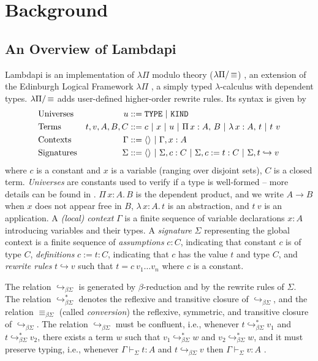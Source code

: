 \section{Background}
\label{sect:background}

\subsection{An Overview of Lambdapi}
\label{ssect:lambdapi-overview}

Lambdapi is an implementation of $\lambda\Pi$ modulo theory ($\lpm$) \cite{lambdapi}, an extension of the Edinburgh Logical Framework $\lambda\Pi$ \cite{lf}, a simply typed $\lambda$-calculus with dependent types. $\lpm$ adds user-defined higher-order rewrite rules. Its syntax is given by
%
\begin{align*}
&\text{Universes}  &u &::= \tt{TYPE} ~|~ \tt{KIND} \\
&\text{Terms}   &t,v, A,B,C &::= c ~|~ x ~|~ u ~|~ \Pi\,x : A,\,B~|~ \lambda\,x : A,\,t ~|~t~v \\
&\text{Contexts}   &\Gamma &::= \langle \rangle ~|~ \Gamma, x : A \\
&\text{Signatures}  &\Sigma &::= \langle \rangle ~|~ \Sigma, c : C ~|~ \Sigma, c := t : C ~|~ \Sigma, t \hookrightarrow v 
\end{align*}
%
where $c$ is a constant and $x$ is a variable  (ranging over disjoint sets), $C$ is a closed term. \emph{Universes} are constants used to verify if a type is well-formed -- more details can be found in \cite[\S 2.1]{lf}. $\Pi\,x : A.\,B$ is the dependent product, and we write $A \rightarrow B$ when $x$ does not appear free in $B$, $\lambda\,x : A.\,t$ is an abstraction, and  $t~v$ is an application. A \emph{(local) context} $\Gamma$ is a finite sequence of variable declarations $x:A$ introducing variables and their types.
A \emph{signature} $\Sigma$ representing the global context is a finite sequence of \emph{assumptions} $c : C$, indicating that constant $c$ is of type $C$, \emph{definitions} $c := t : C$, indicating that $c$ has the value $t$ and type $C$, and \emph{rewrite rules} $t \hookrightarrow v$ such that $t = c~v_1 \dots v_n$ where $c$ is a constant.

The relation $\hookrightarrow_{\beta\Sigma}$ is generated by $\beta$-reduction and by the rewrite rules of $\Sigma$. The relation $\hookrightarrow_{\beta\Sigma}^*$ denotes the reflexive and transitive closure of $\hookrightarrow_{\beta\Sigma}$, and the relation $\equiv_{\beta\Sigma}$ (called \emph{conversion}) the reflexive, symmetric, and transitive closure of $\hookrightarrow_{\beta\Sigma}$. 
The relation $\hookrightarrow_{\beta\Sigma}$ must be confluent, i.e.,
whenever $t \hookrightarrow_{\beta\Sigma}^* v_1$ and $t \hookrightarrow_{\beta\Sigma}^* v_2$, there exists a term $w$ such that $v_1 \hookrightarrow_{\beta\Sigma}^* w$ and $v_2 \hookrightarrow_{\beta\Sigma}^* w$, and it must preserve typing, i.e., 
whenever $\Gamma \vdash_\Sigma t: A$ and $t \hookrightarrow_{\beta\Sigma} v$ then $\Gamma \vdash_\Sigma v: A$ \cite{blanqui:LIPIcs.FSCD.2020.13}.

